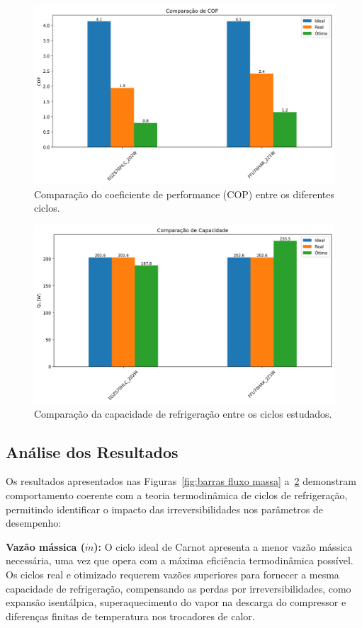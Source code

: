 \begin{figure}[ht]
    \centering
    \includegraphics[width=0.8\linewidth]{Imagens/Desenvolvimento/barras_COP.png}
    \caption{Comparação do coeficiente de performance (COP) entre os diferentes ciclos.}
    \label{fig:barras COP}
\end{figure}

\begin{figure}[ht]
    \centering
    \includegraphics[width=0.8\linewidth]{Imagens/Desenvolvimento/barras_QL.png}
    \caption{Comparação da capacidade de refrigeração entre os ciclos estudados.}
    \label{fig:barras Ql}
\end{figure}

\subsection{Análise dos Resultados}

Os resultados apresentados nas Figuras~\ref{fig:barras fluxo massa} a~\ref{fig:barras Ql} demonstram comportamento coerente com a teoria termodinâmica de ciclos de refrigeração, permitindo identificar o impacto das irreversibilidades nos parâmetros de desempenho:

\textbf{Vazão mássica ($\dot{m}$):} O ciclo ideal de Carnot apresenta a menor vazão mássica necessária, uma vez que opera com a máxima eficiência termodinâmica possível. Os ciclos real e otimizado requerem vazões superiores para fornecer a mesma capacidade de refrigeração, compensando as perdas por irreversibilidades, como expansão isentálpica, superaquecimento do vapor na descarga do compressor e diferenças finitas de temperatura nos trocadores de calor.

